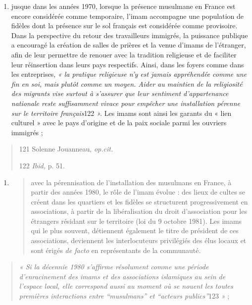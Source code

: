 \begin{enumerate}
\def\labelenumi{\arabic{enumi}.}
\item
  jusque dans les années 1970, lorsque la présence musulmane en France
  est encore considérée comme temporaire, l'imam accompagne une
  population de fidèles dont la présence sur le sol français est
  considérée comme provisoire. Dans la perspective du retour des
  travailleurs immigrés, la puissance publique a encouragé la création
  de salles de prières et la venue d'imams de l'étranger, afin de leur
  permettre de renouer avec la tradition religieuse et de faciliter leur
  réinsertion dans leurs pays respectifs. Ainsi, dans les foyers comme
  dans les entreprises, \emph{« la pratique religieuse n'y est jamais
  appréhendée comme une fin en soi, mais plutôt comme un moyen. Aider au
  maintien de la religiosité des migrants vise surtout à s'assurer que
  leur sentiment d'appartenance nationale reste suffisamment vivace pour
  empêcher une installation pérenne sur le territoire français}122
  \emph{».} Les imams sont ainsi les garants du « lien culturel » avec
  le pays d'origine et de la paix sociale parmi les ouvriers immigrés ;
\end{enumerate}

\begin{quote}
121 Solenne Jouanneau, \emph{op.cit.}

122 \emph{Ibid,} p. 51.


\end{quote}

\begin{enumerate}
\def\labelenumi{\arabic{enumi}.}
\setcounter{enumi}{1}
\item
  \begin{quote}
  avec la pérennisation de l'installation des musulmans en France, à
  partir des années 1980, le rôle de l'imam évolue : des lieux de cultes
  se créent dans les quartiers et les fidèles se structurent
  progressivement en associations, à partir de la libéralisation du
  droit d'association pour les étrangers résidant sur le territoire (loi
  du 9 octobre 1981). Les imams qui le plus souvent, détiennent
  également le titre de président de ces associations, deviennent les
  interlocuteurs privilégiés des élus locaux et sont érigés \emph{de
  facto} en représentants de la communauté.
  \end{quote}
\end{enumerate}

\begin{quote}
\emph{« Si la décennie 1980 s'affirme résolument comme une période
d'enracinement des imams et des associations islamiques au sein de
l'espace local, elle correspond aussi au moment où se nouent les toutes
premières interactions entre ``musulmans'' et ``acteurs publics''}123
\emph{»} ;
\end{quote}

